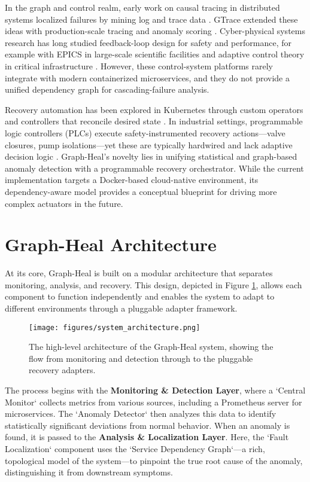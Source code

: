 \documentclass[11pt,conference]{IEEEtran}
\begin{document}
In the graph and control realm, early work on causal tracing in distributed systems localized failures by mining log and trace data \cite{Chen2004}.  GTrace extended these ideas with production-scale tracing and anomaly scoring \cite{Zhu2018}.  Cyber-physical systems research has long studied feedback-loop design for safety and performance, for example with EPICS in large-scale scientific facilities \cite{Dalesio1993} and adaptive control theory in critical infrastructure \cite{Lee2008}.  However, these control-system platforms rarely integrate with modern containerized microservices, and they do not provide a unified dependency graph for cascading-failure analysis.

Recovery automation has been explored in Kubernetes through custom operators and controllers that reconcile desired state \cite{Hightower2017}.  In industrial settings, programmable logic controllers (PLCs) execute safety-instrumented recovery actions—valve closures, pump isolations—yet these are typically hardwired and lack adaptive decision logic \cite{DOE2010}.  Graph-Heal's novelty lies in unifying statistical and graph-based anomaly detection with a programmable recovery orchestrator. While the current implementation targets a Docker-based cloud-native environment, its dependency-aware model provides a conceptual blueprint for driving more complex actuators in the future.


\section{Graph-Heal Architecture}
\label{sec:graphheal-architecture}

At its core, Graph-Heal is built on a modular architecture that separates monitoring, analysis, and recovery. This design, depicted in Figure \ref{fig:system-architecture}, allows each component to function independently and enables the system to adapt to different environments through a pluggable adapter framework.

\begin{figure}[ht]
  \centering
  \texttt{[image: figures/system\_architecture.png]}
  \caption{The high-level architecture of the Graph-Heal system, showing the flow from monitoring and detection through to the pluggable recovery adapters.}
  \label{fig:system-architecture}
\end{figure}

The process begins with the \textbf{Monitoring \& Detection Layer}, where a `Central Monitor` collects metrics from various sources, including a Prometheus server for microservices. The `Anomaly Detector` then analyzes this data to identify statistically significant deviations from normal behavior. When an anomaly is found, it is passed to the \textbf{Analysis \& Localization Layer}. Here, the `Fault Localization` component uses the `Service Dependency Graph`—a rich, topological model of the system—to pinpoint the true root cause of the anomaly, distinguishing it from downstream symptoms.
\end{document}
